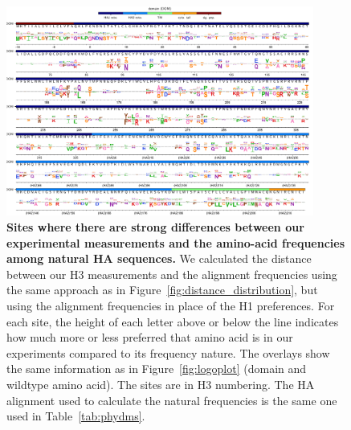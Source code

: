 \documentclass[9pt,twoside,lineno]{pnas-new}
\begin{document}
\begin{figure}
\centerline{\includegraphics[width=0.9\textwidth]{figs/supp_diffprefs/diffprefs.pdf}}
\caption{\label{suppfig:diffprefs_logoplot}
{\bf Sites where there are strong differences between our experimental measurements and the amino-acid frequencies among natural HA sequences.}
We calculated the distance between our H3 measurements and the alignment frequencies using the same approach as in Figure~\ref{fig:distance_distribution}, but using the alignment frequencies in place of the H1 preferences.
For each site, the height of each letter above or below the line indicates how much more or less preferred that amino acid is in our experiments compared to its frequency nature.
The overlays show the same information as in Figure~\ref{fig:logoplot} (domain and wildtype amino acid).
The sites are in H3 numbering.
The HA alignment used to calculate the natural frequencies is the same one used in Table~\ref{tab:phydms}.
}
\end{figure}
\FloatBarrier
\end{document}
